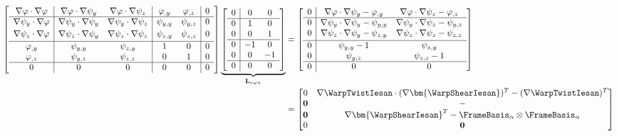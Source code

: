 \[
\begin{aligned}
\left[\begin{array}{c|cc|cc|c}
 \nabla\varphi\cdot\nabla\varphi
 & \nabla\varphi\cdot\nabla\psi_y
 & \nabla\varphi\cdot\nabla\psi_z
 & \varphi_{,y} & \varphi_{,z} & 0 \\ \hline 
 \nabla\psi_y\cdot\nabla\varphi
 & \nabla\psi_y\cdot\nabla\psi_y
 & \nabla\psi_y\cdot\nabla\psi_z
 & \psi_{y,y} & \psi_{y,z} & 0 \\[2pt]
 \nabla\psi_z\cdot\nabla\varphi
 & \nabla\psi_z\cdot\nabla\psi_y
 & \nabla\psi_z\cdot\nabla\psi_z
 & \psi_{z,y} & \psi_{z,z} & 0 \\[2pt]\hline
 \varphi_{,y} & \psi_{y,y} & \psi_{z,y} & 1 & 0 & 0 \\
 \varphi_{,z} & \psi_{y,z} & \psi_{z,z} & 0 & 1 & 0 \\ \hline
 0 & 0 & 0 & 0 & 0 & 0
\end{array}
\right]
\underbrace{\left[\begin{array}{c|cc}
0 & 0 & 0 \\\hline
0 & 1 & 0 \\
0 & 0 & 1 \\ \hline
0 & -1 & 0 \\
0 & 0 & -1 \\ \hline
0 & 0 & 0
\end{array}\right]}_{\mathbf{L}_{v\omega n}}
&= 
\left[\begin{array}{c|cc}
0 &
\nabla\varphi\cdot\nabla\psi_y-\varphi_{,y} &
\nabla\varphi\cdot\nabla\psi_z-\varphi_{,z} \\ \hline
0 &
\nabla\psi_y\cdot\nabla\psi_y-\psi_{y,y} &
\nabla\psi_y\cdot\nabla\psi_z-\psi_{y,z} \\ 
0 &
\nabla\psi_z\cdot\nabla\psi_y-\psi_{z,y} &
\nabla\psi_z\cdot\nabla\psi_z-\psi_{z,z} \\[2pt]\hline
0 & \psi_{y,y}-1 & \psi_{z,y} \\
0 & \psi_{y,z} & \psi_{z,z}-1 \\ \hline
0 & 0 & 0
\end{array}\right] \\
&=\begin{bmatrix}
0 & \nabla\WarpTwistIesan \cdot(\nabla\bm{\WarpShearIesan})^T - (\nabla \WarpTwistIesan)^T \\
\mathbf{0} & -\\
\mathbf{0} & \nabla\bm{\WarpShearIesan}^T - \FrameBasis_{\alpha}\otimes\FrameBasis_{\alpha}\\
0 & \mathbf{0}
\end{bmatrix}
\end{aligned}
\]


